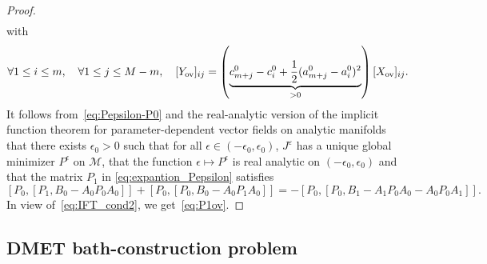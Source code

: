 \documentclass{article}
\newcommand{\1}{{\mathds 1}}
\begin{document}
\begin{proof}
\begin{align}
\end{align}
with
\begin{equation}\label{eq:IFT_cond2}
\forall 1 \le i \le m, \quad \forall 1 \le j \le M-m, \quad [Y_{\rm ov}]_{ij} = \left( \underbrace{c_{m+j}^0-c_i^0 +\frac 12 (a_{m+j}^0-a_i^0)^2}_{> 0} \right) [X_{\rm ov}]_{ij} .
\end{equation}
It follows from~\eqref{eq:Pepsilon-P0} and the real-analytic version of the implicit function theorem for parameter-dependent vector fields on analytic manifolds that there exists $\epsilon_0 > 0$ such that for all $\epsilon \in (-\epsilon_0,\epsilon_0)$, $J^\varepsilon$ has a unique global minimizer $P^\epsilon$ on $\mathcal M$, that the function $\epsilon \mapsto P^\epsilon$ is real analytic on $(-\epsilon_0,\epsilon_0)$ and that the matrix $P_1$ in \eqref{eq:expantion_Pepsilon} satisfies
$$
 [P_0,[P_1,B_0-A_0P_0A_0]]+[P_0,[P_0,B_0-A_0P_1A_0]] = - [P_0,[P_0,B_1-A_1P_0A_0-A_0P_0A_1]].
$$
In view of~\eqref{eq:IFT_cond2}, we get~\eqref{eq:P1ov}.
\end{proof}


\subsection{DMET bath-construction problem}
\label{sec:DMET}
\end{document}
